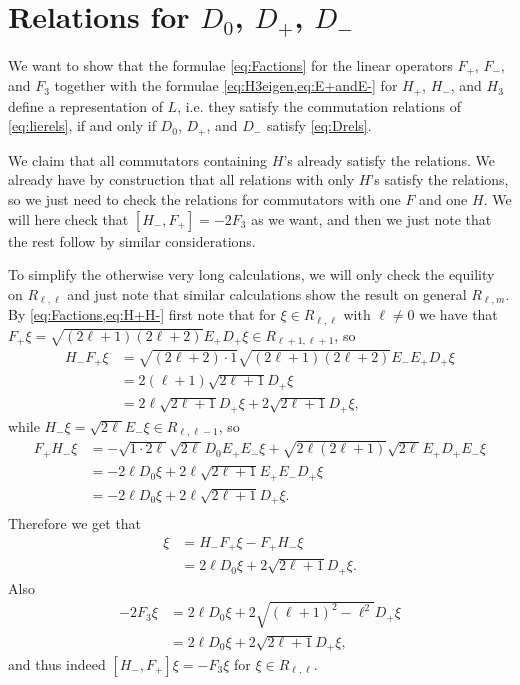 \section{\texorpdfstring{Relations for $D_0$, $D_+$, $D_-$}{Relations for D\_0,D\_+,D\_-}}

We want to show that the formulae \cref{eq:Factions} for the linear operators $F_+$, $F_-$, and $F_3$ together with the formulae \cref{eq:H3eigen,eq:E+andE-} for $H_+$, $H_-$, and $H_3$ define a representation of $L$, i.e. they satisfy the commutation relations of \cref{eq:lierels}, if and only if $D_0$, $D_+$, and $D_-$ satisfy \cref{eq:Drels}.

We claim that all commutators containing $H$'s already satisfy the relations. We already have by construction that all relations with only $H$'s satisfy the relations, so we just need to check the relations for commutators with one $F$ and one $H$. We will here check that $[H_-,F_+] = -2F_3$ as we want, and then we just note that the rest follow by similar considerations.

To simplify the otherwise very long calculations, we will only check the equility on $R_{\ell,\ell}$ and just note that similar calculations show the result on general $R_{\ell,m}$. By \cref{eq:Factions,eq:H+H-} first note that for $\xi\in R_{\ell,\ell}$ with $\ell\neq 0$ we have that $F_+\xi = \sqrt{(2\ell+1)(2\ell+2)}E_+D_+\xi\in R_{\ell+1,\ell+1}$, so
\begin{align*}
  H_-F_+ \xi &= \sqrt{(2\ell+2)\cdot 1}\sqrt{(2\ell+1)(2\ell+2)}E_-E_+D_+\xi \\
           &= 2(\ell+1)\sqrt{2\ell+1}D_+\xi \\
           &= 2\ell\sqrt{2\ell+1}D_+\xi + 2\sqrt{2\ell+1}D_+\xi,
\end{align*}
while $H_-\xi = \sqrt{2\ell}E_-\xi \in R_{\ell,\ell-1}$, so
\begin{align*}
  F_+H_- \xi &= -\sqrt{1\cdot2\ell}\sqrt{2\ell}D_0E_+E_-\xi + \sqrt{2\ell(2\ell+1)}\sqrt{2\ell}E_+D_+E_-\xi \\
           &= -2\ell D_0 \xi + 2\ell\sqrt{2\ell+1}E_+E_-D_+\xi \\
           &= -2\ell D_0 \xi + 2\ell\sqrt{2\ell+1} D_+ \xi. \\
\end{align*}
Therefore we get that
\begin{align*}
  [H_-,F_+] \xi &= H_-F_+ \xi - F_+H_- \xi \\
  &= 2\ell D_0\xi + 2\sqrt{2\ell+1}D_+\xi.
\end{align*}
Also
\begin{align*}
  -2F_3 \xi &= 2\ell D_0\xi + 2\sqrt{(\ell+1)^2-\ell^2} D_+\xi \\
  &= 2\ell D_0\xi + 2\sqrt{2\ell+1} D_+\xi,
\end{align*}
and thus indeed $[H_-,F_+]\xi = -F_3\xi$ for $\xi\in R_{\ell,\ell}$. 

